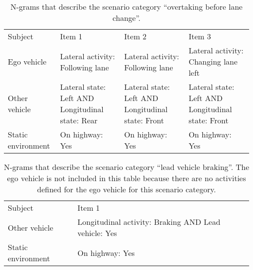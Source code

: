 \begin{table*}
	\centering
	\caption{\cstartc N-grams that describe the scenario category ``overtaking before lane change''.\cendc}
	\label{tab:overtaking lane change}
	\cstartc
	\begin{tabularx}{\linewidth}{lXXX}
		\toprule
		Subject & Item 1 & Item 2 & Item 3 \\ \otoprule
		Ego vehicle & Lateral activity: Following lane & Lateral activity: Following lane & Lateral activity: Changing lane left \\
		Other vehicle & Lateral state: Left AND \newline Longitudinal state: Rear & Lateral state: Left AND \newline Longitudinal state: Front & Lateral state: Left AND \newline  Longitudinal state: Front \\
		Static environment & On highway: Yes & On highway: Yes & On highway: Yes \\
		\bottomrule
	\end{tabularx}
	\cendc
\end{table*}

\begin{table}
	\centering
	\caption{\cstartc N-grams that describe the scenario category ``lead vehicle braking''. The ego vehicle is not included in this table because there are no activities defined for the ego vehicle for this scenario category. \cendc}
	\label{tab:lead vehicle braking}
	\cstartc
	\begin{tabularx}{\linewidth}{lX}
		\toprule
		Subject & Item 1 \\ \otoprule
		Other vehicle & Longitudinal activity: Braking AND \newline Lead vehicle: Yes \\
		Static environment & On highway: Yes \\
		\bottomrule
	\end{tabularx}
	\cendc
\end{table}




